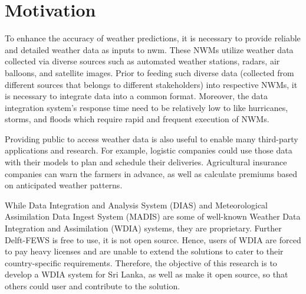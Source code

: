 \section{Motivation}
To enhance the accuracy of weather predictions, it is necessary to provide reliable and detailed weather data as inputs to \acrfull{nwm}. These NWMs utilize  weather data collected via diverse sources such as automated weather stations, radars, air balloons, and satellite images. Prior to feeding such diverse data (collected from different sources that belongs to different stakeholders) into respective NWMs, it is necessary to integrate data into a common format. Moreover, the data integration system’s response time need to be relatively low to %
 like hurricanes, storms, and floods which require rapid and frequent execution of NWMs.


Providing public to access weather data is also useful to enable many third-party applications and research. For example, logistic companies could use those data with their models to plan and schedule their deliveries. Agricultural insurance companies can warn the farmers in advance, as well as calculate premiums based on anticipated weather patterns.

While Data Integration and Analysis System (DIAS) and Meteorological Assimilation Data Ingest System (MADIS) are some of well-known Weather Data Integration and Assimilation (WDIA) systems, they are proprietary. Further Delft-FEWS is free to use, it is not open source. Hence, users of WDIA are forced to pay heavy licenses and are unable to extend the solutions to cater to their country-specific requirements. Therefore, the objective of this research is to develop a WDIA system for Sri Lanka, as well as make it open source, so that others could user and contribute to the solution.

